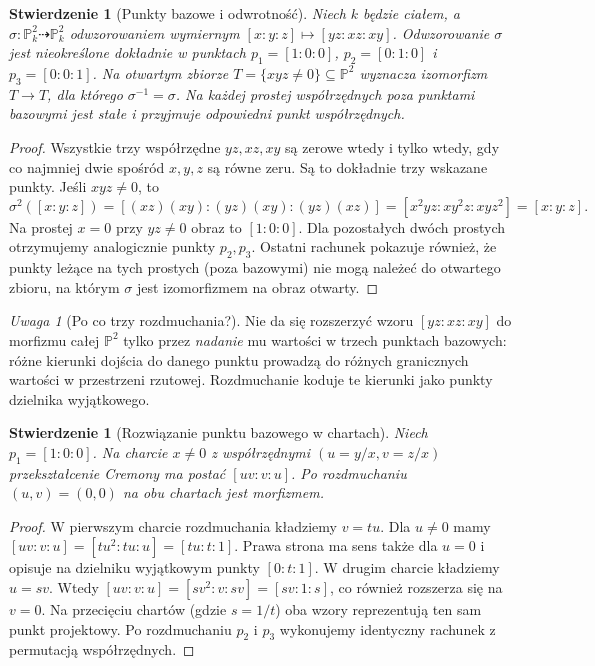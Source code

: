 \documentclass[11pt,a4paper,openany]{report}
\numberwithin{equation}{section}
\theoremstyle{plain}
\newtheorem{stwierdzenie}[twierdzenie]{Stwierdzenie}
\theoremstyle{definition}
\theoremstyle{remark}
\newtheorem{uwaga}[twierdzenie]{Uwaga}
\newcommand{\PP}{\mathbb P}
\begin{document}
\begin{stwierdzenie}[Punkty bazowe i odwrotność]
\label{st:ga8-cremona-basic}
Niech $k$ będzie ciałem, a
$\sigma:\PP^2_k\dashrightarrow\PP^2_k$ odwzorowaniem wymiernym
$[x:y:z]\mapsto[yz:xz:xy]$.
Odwzorowanie $\sigma$ jest nieokreślone dokładnie w punktach
$p_1=[1:0:0]$, $p_2=[0:1:0]$ i $p_3=[0:0:1]$.
Na otwartym zbiorze $T=\{xyz\ne0\}\subseteq\PP^2$
wyznacza izomorfizm $T\to T$, dla którego
$\sigma^{-1}=\sigma$. Na każdej prostej współrzędnych
poza punktami bazowymi jest stałe i przyjmuje
odpowiedni punkt współrzędnych.
\end{stwierdzenie}
\begin{proof}
Wszystkie trzy współrzędne $yz,xz,xy$ są zerowe
wtedy i tylko wtedy, gdy co najmniej dwie spośród
$x,y,z$ są równe zeru. Są to dokładnie trzy wskazane
punkty. Jeśli $xyz\ne0$, to
\[
\sigma^2([x:y:z])
=[(xz)(xy):(yz)(xy):(yz)(xz)]
=[x^2yz:xy^2z:xyz^2]=[x:y:z].
\]
Na prostej $x=0$ przy $yz\ne0$ obraz to $[1:0:0]$.
Dla pozostałych dwóch prostych otrzymujemy analogicznie
punkty $p_2,p_3$. Ostatni rachunek pokazuje również,
że punkty leżące na tych prostych (poza bazowymi)
nie mogą należeć do otwartego zbioru, na którym
$\sigma$ jest izomorfizmem na obraz otwarty.
\end{proof}

\begin{uwaga}[Po co trzy rozdmuchania?]
Nie da się rozszerzyć wzoru $[yz:xz:xy]$ do morfizmu
całej $\PP^2$ tylko przez \emph{nadanie} mu wartości
w trzech punktach bazowych: różne kierunki dojścia
do danego punktu prowadzą do różnych granicznych
wartości w przestrzeni rzutowej. Rozdmuchanie koduje
te kierunki jako punkty dzielnika wyjątkowego.
\end{uwaga}

\begin{stwierdzenie}[Rozwiązanie punktu bazowego w chartach]
\label{st:ga8-local-resolution}
Niech $p_1=[1:0:0]$. Na charcie $x\ne0$ z
współrzędnymi $(u=y/x,v=z/x)$ przekształcenie Cremony
ma postać $[uv:v:u]$. Po rozdmuchaniu $(u,v)=(0,0)$
na obu chartach jest morfizmem.
\end{stwierdzenie}
\begin{proof}
W pierwszym charcie rozdmuchania kładziemy $v=tu$.
Dla $u\ne0$ mamy
$[uv:v:u]=[tu^2:tu:u]=[tu:t:1]$.
Prawa strona ma sens także dla $u=0$ i opisuje
na dzielniku wyjątkowym punkty $[0:t:1]$.
W drugim charcie kładziemy $u=sv$. Wtedy
$[uv:v:u]=[sv^2:v:sv]=[sv:1:s]$,
co również rozszerza się na $v=0$.
Na przecięciu chartów (gdzie $s=1/t$)
oba wzory reprezentują ten sam punkt projektowy.
Po rozdmuchaniu $p_2$ i $p_3$ wykonujemy identyczny
rachunek z permutacją współrzędnych.
\end{proof}
\end{document}
